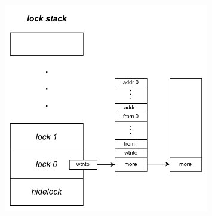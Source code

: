 {    \begin{figure}[!htbp]
        \centering
        \includegraphics[width=0.80\textwidth]{Img/锁栈.drawio.pdf}
        \label{fig:JIAJIA-lockstack}
    \end{figure}

    

}
